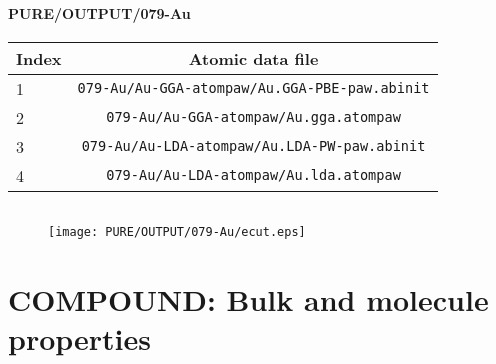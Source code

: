 \documentclass[onecolumn]{revtex4}
\begin{document}
\paragraph*{\bf{PURE/OUTPUT/079-Au}}
\begin{center}
\begin{tabular}{lc}
\hline
Index & Atomic data file \\
\hline
1 & \verb?079-Au/Au-GGA-atompaw/Au.GGA-PBE-paw.abinit?\\
2 & \verb?079-Au/Au-GGA-atompaw/Au.gga.atompaw?\\
3 & \verb?079-Au/Au-LDA-atompaw/Au.LDA-PW-paw.abinit?\\
4 & \verb?079-Au/Au-LDA-atompaw/Au.lda.atompaw?\\
\hline
\end{tabular}
\end{center}
\begin{center}
\begin{tabular}{lccccc}
\hline
\hline
\end{tabular}
\end{center}
\begin{figure}[h] 
\centering 
\texttt{[image: PURE/OUTPUT/079-Au/ecut.eps]}
\end{figure}
\newpage
\section{COMPOUND: Bulk and molecule properties}
\newpage
\end{document}
